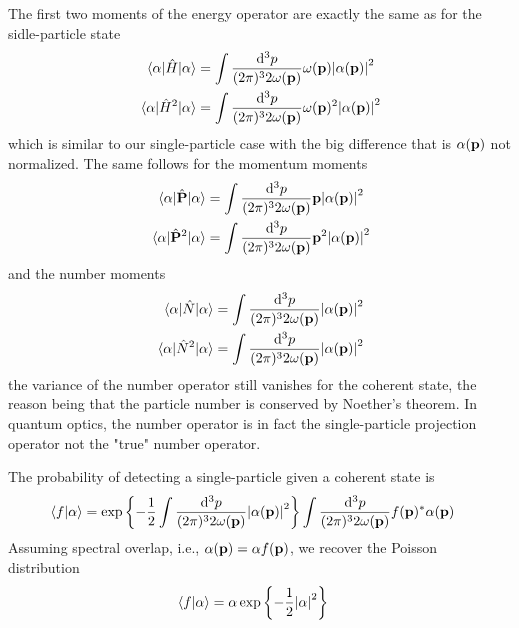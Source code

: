 The first two moments of the energy operator are exactly the same as for the sidle-particle state
\begin{align}
	\expval{\hat{H}}{\alpha}
	&=
	\int\frac{\dd[3]{p}}{(2\pi)^32\omega(\vb{p})}
	\omega(\vb{p})
	\abs{\alpha(\vb{p})}^2
	\\
	\expval{\hat{H}^2}{\alpha}
	&=
	\int\frac{\dd[3]{p}}{(2\pi)^32\omega(\vb{p})}
	\omega(\vb{p})^2
	\abs{\alpha(\vb{p})}^2
\end{align}
which is similar to our single-particle case with the big difference that is $\alpha(\vb{p})$ not normalized.
The same follows for the momentum moments
\begin{align}
	\expval{\hat{\vb{P}}}{\alpha}
	&=
	\int\frac{\dd[3]{p}}{(2\pi)^32\omega(\vb{p})}
	\vb{p}
	\abs{\alpha(\vb{p})}^2
	\\
	\expval{\hat{\vb{P}}^2}{\alpha}
	&=
	\int\frac{\dd[3]{p}}{(2\pi)^32\omega(\vb{p})}
	\vb{p}^2
	\abs{\alpha(\vb{p})}^2
\end{align}
and the number moments
\begin{align}
	\expval{\hat{N}}{\alpha}
	&=
	\int\frac{\dd[3]{p}}{(2\pi)^32\omega(\vb{p})}
	\abs{\alpha(\vb{p})}^2
	\\
	\expval{\hat{N}^2}{\alpha}
	&=
	\int\frac{\dd[3]{p}}{(2\pi)^32\omega(\vb{p})}
	\abs{\alpha(\vb{p})}^2
\end{align}
the variance of the number operator still vanishes for the coherent state, the reason being that the particle number is conserved by Noether's theorem.
In quantum optics, the number operator is in fact the single-particle projection operator not the "true" number operator.

The probability of detecting a single-particle given a coherent state is
\begin{equation}
	\begin{split}
		\braket{f}{\alpha}
		&=
		\exp\left\{
			-
			\frac{1}{2}
			\int\frac{\dd[3]{p}}{(2\pi)^32\omega(\vb{p})}
			\abs{\alpha(\vb{p})}^2
		\right\}
		\int\frac{\dd[3]{p}}{(2\pi)^32\omega(\vb{p})}
		f(\vb{p})^*
		\alpha(\vb{p})
	\end{split}
\end{equation}
Assuming spectral overlap, i.e., $\alpha(\vb{p})=\alpha f(\vb{p})$, we recover the Poisson distribution
\begin{equation}
	\begin{split}
		\braket{f}{\alpha}
		&=
		\alpha
		\exp\left\{
			-
			\frac{1}{2}
			\abs{\alpha}^2
		\right\}
	\end{split}
\end{equation}